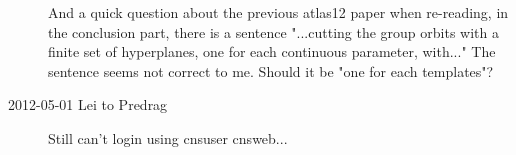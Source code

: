 \begin{description}
And a quick question about the previous atlas12 paper when re-reading, in the conclusion part, there is a sentence "...cutting the group orbits with a finite set of hyperplanes,
one for each continuous parameter, with..." The sentence seems not correct to me. Should it be "one for each templates"? 

\item[2012-05-01 Lei to Predrag] Still can't login using cnsuser cnsweb...

\end{description}

